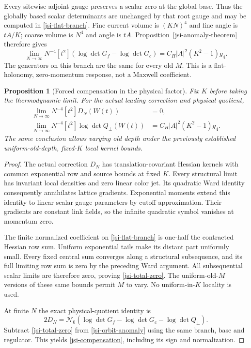 \documentclass[11pt]{article}
\newtheorem{proposition}[theorem]{Proposition}
\theoremstyle{remark}
\begin{document}
Every sitewise adjoint gauge preserves a scalar zero at the
global base. Thus the globally based scalar determinants are
unchanged by that root gauge and may be computed in
\eqref{jsi-flat-branch}.
Fine current volume is \((KN)^4\) and fine angle is \(tA/K\);
coarse volume is \(N^4\) and angle is \(tA\).
Proposition~\ref{jsi-anomaly-theorem} therefore gives
\begin{equation}
 \lim_{N\to\infty}N^{-4}[t^2]
         (\log\det G_f-\log\det G_c)
             =C_H|A|^2(K^2-1)g_4.
 \label{jsi-orbit-anomaly}
\end{equation}
The generators on this branch are the same for every old \(M\).
This is a flat-holonomy, zero-momentum response, not a Maxwell
coefficient.

\begin{proposition}[Forced compensation in the physical factor]
\label{jsi-compensation-theorem}
Fix \(K\) before taking the thermodynamic limit.
For the actual leading correction and physical quotient,
\begin{align}
 \lim_{N\to\infty}N^{-4}[t^2]D_N(W(t))&=0,
       \label{jsi-total-zero}\\
 \lim_{N\to\infty}N^{-4}[t^2]\log\det Q_\perp(W(t))
                  &=C_H|A|^2(K^2-1)g_4.
       \label{jsi-compensation}
\end{align}
The same conclusion allows varying old depth under the
previously established uniform-old-depth, fixed-\(K\) local
kernel bounds.
\end{proposition}

\begin{proof}
The actual correction \(D_N\) has translation-covariant Hessian
kernels with common exponential row and source bounds at fixed
\(K\). Every structural limit has invariant local densities and
zero linear color jet. Its quadratic Ward identity consequently
annihilates lattice gradients. Exponential moments extend this
identity to linear scalar gauge parameters by cutoff approximation.
Their gradients are constant link fields, so the infinite
quadratic symbol vanishes at momentum zero.

The finite normalized coefficient on \eqref{jsi-flat-branch} is
one-half the contracted Hessian row sum. Uniform exponential
tails make its distant part uniformly small. Every fixed
central sum converges along a structural subsequence, and its
full limiting row sum is zero by the preceding Ward argument.
All subsequential scalar limits are therefore zero, proving
\eqref{jsi-total-zero}. The uniform-old-\(M\) versions of these
same bounds permit \(M\) to vary. No uniform-in-\(K\) locality
is used.

At finite \(N\) the exact physical-quotient identity is
\begin{equation}
 2D_N=\mathcal N_0
       (\log\det G_f-\log\det G_c-\log\det Q_\perp).
 \label{jsi-actual-identity}
\end{equation}
Subtract \eqref{jsi-total-zero} from
\eqref{jsi-orbit-anomaly} using the same branch, base and
regulator. This yields \eqref{jsi-compensation}, including
its sign and normalization.
\end{proof}
\end{document}

